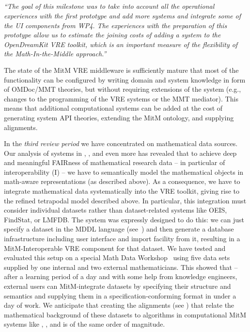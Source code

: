 \subparagraph{}
\emph{“The goal of this milestone was to take into account all the operational experiences with the first prototype and add more systems and integrate some of the UI components from WP4.
  The experiences with the preparation of this prototype allow us to estimate the joining costs of adding a system to the OpenDreamKit VRE toolkit, which is an important measure of the flexibility of the Math-In-the-Middle approach.”}

The state of the MitM VRE middleware is sufficiently mature that most of the functionality can be configured by writing domain and system knowledge in form of OMDoc/MMT theories, but without requiring extensions of the system (e.g., changes to the programming of the VRE systems or the MMT mediator).
This means that additional computational systems can be added at the cost of generating system API theories, extending the MitM ontology, and supplying alignments.

In the \emph{third review period} we have concentrated on mathematical data sources.
Our analysis of systems in , , and even more  has revealed that to achieve deep and meaningful FAIRness of mathematical research data -- in particular of interoperability (I) -- we have to semantically model the mathematical objects in math-aware representations (as described above).
As a consequence, we have to integrate mathematical data systematically into the \pn VRE toolkit, giving rise to the refined tetrapodal model described above. In particular, this integration must consider individual datasets rather than dataset-related systems like OEIS, FindStat, or LMFDB.
The \dmh system was expressly designed to do this: we can just specify a dataset in the MDDL language (see~\cite{BerKohRab:tumdi19,ODK-D6.10}) and then generate a database infrastructure including user interface and import facility from it, resulting in a MitM-Interoperable VRE component for that dataset.
We have tested and evaluated this setup on a special Math Data Workshop~\cite{ODK-WDM19} using five data sets supplied by one internal and two external mathematicians.
This showed that -- after a learning period of a day and with some help from \pn knowledge engineers, external users can MitM-integrate datasets by specifying their structure and semantics and supplying them in a specification-conforming format in under a day of work.
We anticipate that creating the alignments (see \cite{ODK-D6.5}) that relate the mathematical background of these datasets to algorithms in computational MitM systems like \GAP, \Sage, and \Singular is of the same order of magnitude. 


